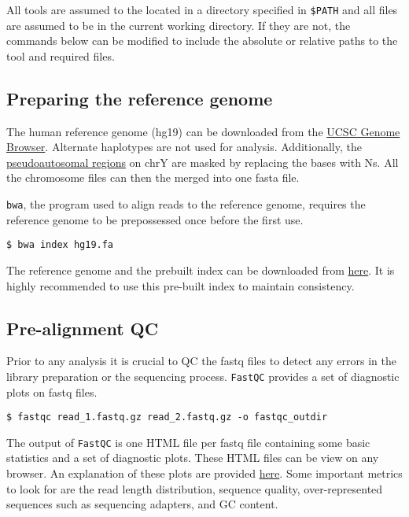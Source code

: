 \documentclass[11pt]{article}
\newcommand{\prog}[1]{\texttt{#1}}
\begin{document}
All tools are assumed to the located in a directory specified in
\texttt{\$PATH} and all files are assumed to be in the current working
directory. If they are not, the commands below can be modified to
include the absolute or relative paths to the tool and required files.

\subsection{Preparing the reference genome}
\label{index}
The human reference genome (hg19) can be downloaded from the
\href{http://hgdownload.cse.ucsc.edu/goldenpath/hg19/bigZips/chromFa.tar.gz}
{UCSC Genome Browser}. Alternate haplotypes are not used for analysis.
Additionally, the
\href{https://en.wikipedia.org/wiki/Pseudoautosomal\_region}{pseudoautosomal
regions} on chrY are masked by replacing the bases with Ns. All the
chromosome files can then the merged into one fasta file.

\prog{bwa}, the program used to align reads to the reference genome,
requires the reference genome to be prepossessed once before the first
use.
\begin{verbatim}
$ bwa index hg19.fa
\end{verbatim}

The reference genome and the prebuilt index can be downloaded from
\href{}{here}. It is highly recommended to use this pre-built index to
maintain consistency.

\subsection{Pre-alignment QC}
Prior to any analysis it is crucial to QC the fastq files to detect any
errors in the library preparation or the sequencing process.
\prog{FastQC} provides a set of diagnostic plots on fastq files.
\begin{verbatim}
$ fastqc read_1.fastq.gz read_2.fastq.gz -o fastqc_outdir
\end{verbatim}

The output of \prog{FastQC} is one HTML file per fastq file containing
some basic statistics and a set of diagnostic plots.
These HTML files can be view on any browser. An explanation of these
plots are provided
\href{https://www.bioinformatics.babraham.ac.uk/projects/fastqc/}{here}.
Some important metrics to look for are the read length distribution,
sequence quality, over-represented sequences such as sequencing
adapters, and GC content.
\end{document}
